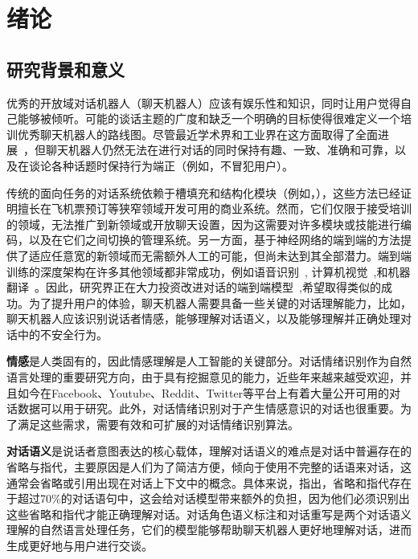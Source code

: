 \chapter{绪论}
\section{研究背景和意义}
优秀的开放域对话机器人（聊天机器人）应该有娱乐性和知识，同时让用户觉得自己能够被倾听。可能的谈话主题的广度和缺乏一个明确的目标使得很难定义一个培训优秀聊天机器人的路线图。尽管最近学术界和工业界在这方面取得了全面进展~\cite{adiwardana2020meena,roller2020recipes}，但聊天机器人仍然无法在进行对话的同时保持有趣、一致、准确和可靠，以及在谈论各种话题时保持行为端正（例如，不冒犯用户）。

传统的面向任务的对话系统依赖于槽填充和结构化模块（例如，\citet{young2013pomdp,gao2019neural,jurafsky2019speech}），这些方法已经证明擅长在飞机票预订等狭窄领域开发可用的商业系统。然而，它们仅限于接受培训的领域，无法推广到新领域或开放聊天设置，因为这需要对许多模块或技能进行编码，以及在它们之间切换的管理系统。另一方面，基于神经网络的端到端的方法提供了适应任意宽的新领域而无需额外人工的可能，但尚未达到其全部潜力。端到端训练的深度架构在许多其他领域都非常成功，例如语音识别~\cite{hinton2012deep,collobert2016wav2letter}, 计算机视觉~\cite{krizhevsky2012imagenet},和机器翻译~\cite{sutskever2014sequence,gehring2017convolutional}。因此，研究界正在大力投资改进对话的端到端模型~\cite{zhang2019dialogpt,adiwardana2020meena,roller2020recipes},希望取得类似的成功。为了提升用户的体验，聊天机器人需要具备一些关键的对话理解能力，比如，聊天机器人应该识别说话者情感，能够理解对话语义，以及能够理解并正确处理对话中的不安全行为。

\textbf{情感}是人类固有的，因此情感理解是人工智能的关键部分。对话情绪识别作为自然语言处理的重要研究方向，由于具有挖掘意见的能力，近些年来越来越受欢迎，并且如今在Facebook、Youtube、Reddit、Twitter等平台上有着大量公开可用的对话数据可以用于研究。此外，对话情绪识别对于产生情感意识的对话也很重要。为了满足这些需求，需要有效和可扩展的对话情绪识别算法。

\textbf{对话语义}是说话者意图表达的核心载体，理解对话语义的难点是对话中普遍存在的省略与指代，主要原因是人们为了简洁方便，倾向于使用不完整的话语来对话，这通常会省略或引用出现在对话上下文中的概念。具体来说，\citet{su-etal-2019-improving,pan-etal-2019-improving}指出，省略和指代存在于超过70\%的对话语句中，这会给对话模型带来额外的负担，因为他们必须识别出这些省略和指代才能正确理解对话。对话角色语义标注和对话重写是两个对话语义理解的自然语言处理任务，它们的模型能够帮助聊天机器人更好地理解对话，进而生成更好地与用户进行交谈。

